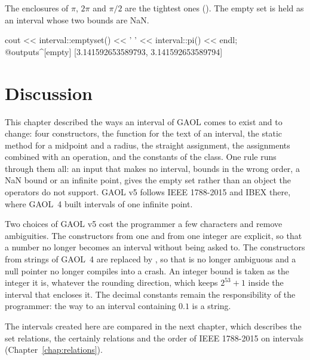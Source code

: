 \documentclass[12pt,a4paper,twoside,openright]{book}
\begin{document}
\noindent
The enclosures of $\pi$, $2\pi$ and $\pi/2$ are the tightest ones
(). The empty set is held as an interval whose two
bounds are NaN.
%

\begin{example}
cout << interval::emptyset() << ' ' << interval::pi() << endl;
@outputs^[empty] [3.141592653589793, 3.141592653589794]~
\end{example}

\section{Discussion}

This chapter described the ways an interval of GAOL comes to exist and to
change: four constructors, the function  for the text
of an interval, the static method  for a midpoint and a
radius, the straight assignment, the assignments combined with an operation,
and the constants of the class. One rule runs through them all: an input that
makes no interval, bounds in the wrong order, a NaN bound or an infinite
point, gives the empty set rather than an object the operators do not
support. GAOL v5 follows IEEE 1788-2015 and IBEX there, where GAOL~4 built
intervals of one infinite point.\newinvfive

\medskip
Two choices of GAOL v5 cost the programmer a few characters and remove
ambiguities. The constructors from one  and from one integer are
explicit, so that a number no longer becomes an interval without being asked
to.\newinvfive{} The constructors from strings of GAOL~4 are replaced by
, so that  is no longer ambiguous
and a null pointer no longer compiles into a crash.\newinvfive{} An integer
bound is taken as the integer it is, whatever the rounding direction, which
keeps $2^{53}+1$ inside the interval that encloses it. The decimal constants
remain the responsibility of the programmer: the way to an interval
containing $0.1$ is a string.

\medskip
The intervals created here are compared in the next chapter, which describes
the set relations, the certainly relations and the order of IEEE 1788-2015 on
intervals (Chapter~\ref{chap:relations}).

\end{document}
